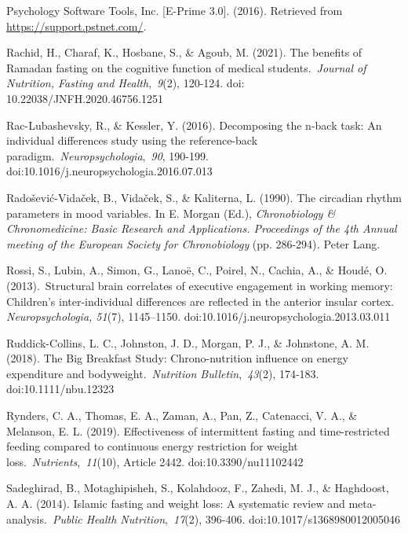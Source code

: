 \documentclass[authordate, empirical]{jote-new-article}
\begin{document}
Psychology Software Tools, Inc. [E-Prime 3.0]. (2016). Retrieved from \href{https://support.pstnet.com/?_ga=2.129355721.472427428.1688473658-755226607.1688473658&amp;_gl=1*px0hew*_ga*NzU1MjI2NjA3LjE2ODg0NzM2NTg.*_ga_8H8T10VXZT*MTY4ODQ3MzY1OC4xLjAuMTY4ODQ3MzY1OC42MC4wLjA.}{https://support.pstnet.com/}.



Rachid, H., Charaf, K., Hosbane, S., \& Agoub, M. (2021). The benefits of Ramadan fasting on the cognitive function of medical students. \emph{Journal of Nutrition, Fasting and Health}, \emph{9}(2), 120-124. doi: 10.22038/JNFH.2020.46756.1251



Rac-Lubashevsky, R., \& Kessler, Y. (2016). Decomposing the n-back task: An individual differences study using the reference-back paradigm. \emph{Neuropsychologia}, \emph{90}, 190-199. doi:10.1016/j.neuropsychologia.2016.07.013



Radošević-Vidaček, B., Vidaček, S., \& Kaliterna, L. (1990). The circadian rhythm parameters in mood variables. In E. Morgan (Ed.), \emph{Chronobiology \& Chronomedicine: Basic Research and Applications. Proceedings of the 4th Annual meeting of the European Society for Chronobiology }(pp. 286-294)\emph{. }Peter Lang.



Rossi, S., Lubin, A., Simon, G., Lanoë, C., Poirel, N., Cachia, A., \& Houdé, O. (2013). Structural brain correlates of executive engagement in working memory: Children's inter-individual differences are reflected in the anterior insular cortex.\emph{ Neuropsychologia, 51}(7), 1145--1150. doi:10.1016/j.neuropsychologia.2013.03.011



Ruddick-Collins, L. C., Johnston, J. D., Morgan, P. J., \& Johnstone, A. M. (2018). The Big Breakfast Study: Chrono-nutrition influence on energy expenditure and bodyweight. \emph{Nutrition Bulletin}, \emph{43}(2), 174-183. doi:10.1111/nbu.12323



Rynders, C. A., Thomas, E. A., Zaman, A., Pan, Z., Catenacci, V. A., \& Melanson, E. L. (2019). Effectiveness of intermittent fasting and time-restricted feeding compared to continuous energy restriction for weight loss. \emph{Nutrients}, \emph{11}(10), Article 2442. doi:10.3390/nu11102442



Sadeghirad, B., Motaghipisheh, S., Kolahdooz, F., Zahedi, M. J., \& Haghdoost, A. A. (2014). Islamic fasting and weight loss: A systematic review and meta-analysis. \emph{Public Health Nutrition}, \emph{17}(2), 396-406. doi:10.1017/s1368980012005046
\end{document}
